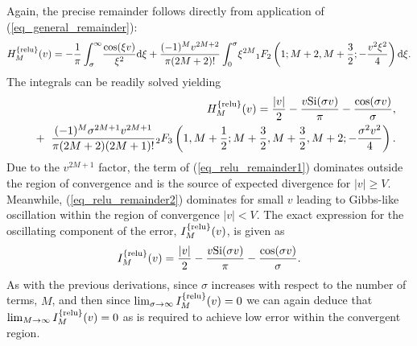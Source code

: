 Again, the precise remainder follows directly from
application of (\ref{eq_general_remainder}):
\begin{align}
\begin{split}
	H_M^{\{\operatorname{relu}\}}(v) = -\frac{1}{\pi} \int_\sigma^{\infty} \!
	\frac{\cos(\xi v)}{\xi^2} \mathrm{d}\xi
	+ \frac{(-1)^M v^{2M+2}}{\pi (2M+2)!} \int_0^{\sigma} \!
	\xi^{2M}{}_{1}F_{2}\left(1; M+2, M+\frac{3}{2}; -\frac{v^2 \xi^2}{4}\right) \mathrm{d}\xi.
\end{split}
\end{align}
The integrals can be readily solved yielding
\begin{align}
	\begin{split}
		&H_M^{\{\operatorname{relu}\}}(v) = 
		\frac{|v|}{2} - \frac{v \mathrm{Si}(\sigma v)}{\pi}
		- \frac{\cos(\sigma v)}{\sigma}, \label{eq_relu_remainder2}
	\end{split}
	\\
	\begin{split}
		&\quad\quad+\ \frac{(-1)^M \sigma^{2M+1} v^{2M+1}}{\pi (2M+2)(2M+1)!}
		{}_{2}F_{3}\left(1, M + \frac{1}{2}; M + \frac{3}{2}, M + \frac{3}{2}, M + 2; -\frac{\sigma^2 v^2}{4}\right) \label{eq_relu_remainder1}.
	\end{split}
\end{align}
Due to the $v^{2M+1}$ factor, the term of
(\ref{eq_relu_remainder1}) dominates outside the region
of convergence and is the source of expected divergence for
$|v| \geq V$. Meanwhile, (\ref{eq_relu_remainder2}) dominates
for small $v$ leading to Gibbs-like oscillation within the
region of convergence $|v| < V$.  The exact expression for
the oscillating component of the error, $I_M^{\{\operatorname{relu}\}}(v)$,
is given as
\begin{align}
	I_M^{\{\operatorname{relu}\}}(v) = \frac{|v|}{2} - \frac{v \mathrm{Si}(\sigma v)}{\pi}
	- \frac{\cos(\sigma v)}{\sigma}.
\end{align}
As with the previous derivations, since $\sigma$ increases
with respect to the number of terms, $M$,
and then since $\lim_{\sigma \to \infty}I_M^{\{\operatorname{relu}\}}(v) = 0$ we can again
deduce that $\lim_{M \to \infty}I_M^{\{\operatorname{relu}\}}(v) = 0$ as is required
to achieve low error within the convergent region.

